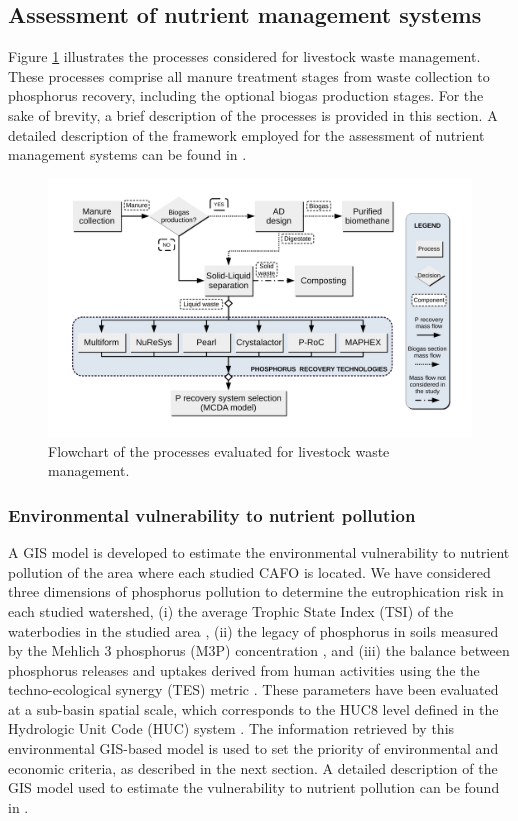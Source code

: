 \begin{refsection}[referencesCh5]
\subsection{Assessment of nutrient management systems}
Figure \ref{fig:techs_diagramsPaperIncentives} illustrates the processes considered for livestock waste management. These processes comprise all manure treatment stages from waste collection to phosphorus recovery, including the optional biogas production stages. For the sake of brevity, a brief description of the processes is provided in this section. A detailed description of the framework employed for the assessment of nutrient management systems can be found in \citet{Tool}.

\begin{figure}[h!]
	\centering
	\includegraphics[width=0.85\linewidth, trim={1.5cm 1.5cm 1.5cm 1.5cm},clip]{gfx/Chapter5/Process_FlowsheetClean.pdf} 
	\caption{Flowchart of the processes evaluated for livestock waste management.}
	\label{fig:techs_diagramsPaperIncentives}
\end{figure}

\subsubsection{Environmental vulnerability to nutrient pollution}\label{section:EnvVulNutPol}
A
GIS model is developed to estimate the environmental vulnerability to nutrient pollution of the area where each studied CAFO is located. We have considered three dimensions of phosphorus pollution to determine the eutrophication risk in each studied watershed, (i) the average Trophic State Index (TSI) of the waterbodies in the studied area \citep{carlson_trophic_1977}, (ii) the legacy of phosphorus in soils measured by the Mehlich 3 phosphorus (M3P) concentration \citep{Espinoza2006}, and (iii) the balance between phosphorus releases and uptakes derived from human activities using the the techno-ecological synergy (TES) metric \citep{TESmetric}. These parameters have been evaluated at a sub-basin spatial scale, which corresponds to the HUC8 level defined in the Hydrologic Unit Code (HUC) system \citep{HUC8}. The information retrieved by this environmental GIS-based model is used to set the priority of environmental and economic criteria, as described in the next section. A detailed description of the GIS model used to estimate the vulnerability to nutrient pollution can be found in \citet{Tool}.


\end{refsection}
